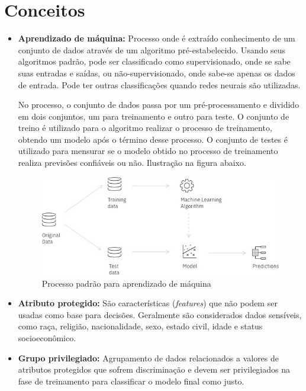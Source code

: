 \documentclass[portugues, 12pt, a4paper]{article}
\begin{document}
\section{Conceitos}

\begin{itemize}
\item \textbf{Aprendizado de máquina:} Processo onde é extraído conhecimento de um conjunto de dados através de um algoritmo pré-estabelecido. Usando seus algoritmos padrão, pode ser classificado como supervisionado, onde se sabe suas entradas e saídas, ou não-supervisionado, onde sabe-se apenas os dados de entrada. Pode ter outras classificações quando redes neurais são utilizadas.

No processo, o conjunto de dados passa por um pré-processamento e dividido em dois conjuntos, um para treinamento e outro para teste. O conjunto de treino é utilizado para o algoritmo realizar o processo de treinamento, obtendo um modelo após o término desse processo. O conjunto de testes é utilizado para mensurar se o modelo obtido no processo de treinamento realiza previsões confiáveis ou não. Ilustração na figura abaixo.

\begin{figure}[h]
\centering
\includegraphics[scale=0.5]{images/ML_Process.jpg}
\caption {Processo padrão para aprendizado de máquina}
\label{fig:MLProcess}
\end{figure}

\item \textbf{Atributo protegido:} São características (\textit{features}) que não podem ser usadas como base para decisões. Geralmente são considerados dados sensíveis, como raça, religião, nacionalidade, sexo, estado civil, idade e status socioeconômico.

\item \textbf{Grupo privilegiado:} Agrupamento de dados relacionados a valores de atributos protegidos que sofrem discriminação e devem ser privilegiados na fase de treinamento para classificar o modelo final como justo.


\end{itemize}
\end{document}
